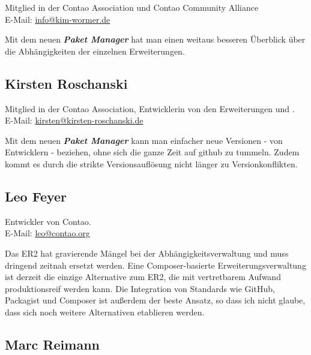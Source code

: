 \documentclass[
paper=a4,
draft=false,%
fontsize=10pt%
]{scrartcl}
\newcommand{\packageManager}{\textbf{\textit{Paket Manager}}}
\begin{document}
Mitglied in der Contao Association und Contao Community Alliance \\
E-Mail: \href{mailto:info@kim-wormer.de}{info@kim-wormer.de}

\begin{emquote}{}
Mit dem neuen \packageManager{} hat man einen weitaus besseren Überblick über die Abhängigkeiten der einzelnen Erweiterungen.
\end{emquote}

\subsection*{Kirsten  Roschanski}

Mitglied in der Contao Association, Entwicklerin von den Erweiterungen  und .\\
E-Mail: \href{mailto:kirsten@kirsten-roschanski.de}{kirsten@kirsten-roschanski.de}

\begin{emquote}{}
Mit dem neuen \packageManager{} kann man einfacher neue Versionen - von Entwicklern - beziehen, ohne sich die ganze Zeit auf github zu tummeln. Zudem kommt es durch die strikte Versionsauflösung nicht länger zu Versionkonflikten.
\end{emquote}

\pagebreak

\subsection*{Leo  Feyer}

Entwickler von Contao.\\
E-Mail: \href{mailto:leo@contao.org}{leo@contao.org}

\begin{emquote}{}
Das ER2 hat gravierende Mängel bei der Abhängigkeitsverwaltung und muss dringend zeitnah ersetzt werden. Eine Composer-basierte Erweiterungsverwaltung ist derzeit die einzige Alternative zum ER2, die mit vertretbarem Aufwand produktionsreif werden kann. Die Integration von Standards wie GitHub, Packagist und Composer ist außerdem der beste Ansatz, so dass ich nicht glaube, dass sich noch weitere Alternativen etablieren werden.
\end{emquote}

\subsection*{Marc  Reimann}
\end{document}
